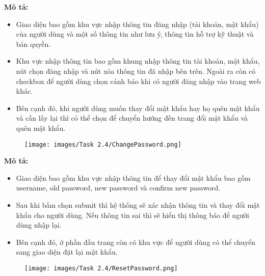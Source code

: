     \textbf{Mô tả:}
    \begin{itemize}
        \item Giao diện bao gồm khu vực nhập thông tin đăng nhập (tài khoản, mật khẩu) của người dùng và một số thông tin như lưu ý, thông tin hỗ trợ kỹ thuật và bản quyền.
        \item Khu vực nhập thông tin bao gồm khung nhập thông tin tài khoản, mật khẩu, nút chọn đăng nhập và nút xóa thông tin đã nhập bên trên. Ngoài ra còn có checkbox để người dùng chọn cảnh báo khi có người đăng nhập vào trang web khác.
        \item Bên cạnh đó, khi người dùng muốn thay đổi mật khẩu hay họ quên mật khẩu và cần lấy lại thì có thể chọn để chuyển hướng đến trang đổi mật khẩu và quên mật khẩu.
    \end{itemize}
    \newpage
    \begin{center}
    \begin{figure}[!htp]
    \begin{center}
     \texttt{[image: images/Task 2.4/ChangePassword.png]}
    \end{center}
    \label{refhinh1}
    \end{figure}
    \end{center}
    
    \textbf{Mô tả:}
    \begin{itemize}
        \item Giao diện bao gồm khu vực nhập thông tin để thay đổi mật khẩu bao gồm username, old password, new password và confirm new password.
        \item Sau khi bấm chọn submit thì hệ thống sẽ xác nhận thông tin và thay đổi mật khẩu cho người dùng. Nếu thông tin sai thì sẽ hiển thị thông báo để người dùng nhập lại.
        \item Bên cạnh đó, ở phần đầu trang còn có khu vực để người dùng có thể chuyển sang giao diện đặt lại mật khẩu.
    \end{itemize}
    \newpage
    \begin{center}
    \begin{figure}[!htp]
    \begin{center}
     \texttt{[image: images/Task 2.4/ResetPassword.png]}
    \end{center}
    \label{refhinh1}
    \end{figure}
    \end{center}

